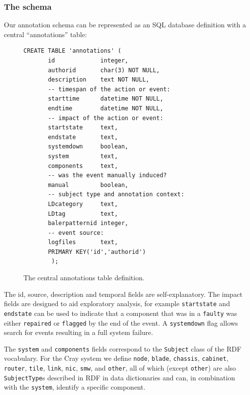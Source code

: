 \subsubsection{The schema}

Our annotation schema can be represented as an SQL database definition with a central 
``annotations'' table:

\begin{figure}[H]
\begin{small}
\begin{verbatim}
CREATE TABLE 'annotations' (
       id             integer,
       authorid       char(3) NOT NULL,
       description    text NOT NULL,
       -- timespan of the action or event:
       starttime      datetime NOT NULL,
       endtime        datetime NOT NULL,
       -- impact of the action or event:
       startstate     text,
       endstate       text,
       systemdown     boolean,
       system         text,
       components     text,
       -- was the event manually induced?
       manual         boolean,
       -- subject type and annotation context:
       LDcategory     text,
       LDtag          text,
       balerpatternid integer,
       -- event source:
       logfiles       text,
       PRIMARY KEY('id','authorid')
        );
\end{verbatim}
\end{small}
\caption{The central annotations table definition. }
\label{f:ann-table}
\end{figure}

The id, source, description and temporal fields are self-explanatory. 
The impact fields are designed to aid exploratory analysis, for example
\texttt{startstate} and \texttt{endstate} can be used to indicate that
a component that was in a \texttt{faulty} was either \texttt{repaired}
or \texttt{flagged} by the end of the event. A \texttt{systemdown} flag
allows search for events resulting in a full system failure.

The \texttt{system} and \texttt{components} fields correspond to the 
\texttt{Subject} class of the RDF vocabulary.
For the Cray system we define \texttt{node}, \texttt{blade}, \texttt{chassis},
\texttt{cabinet}, \texttt{router}, \texttt{tile}, \texttt{link}, \texttt{nic},
\texttt{smw}, and \texttt{other}, all of which (except \texttt{other}) are 
also \texttt{SubjectType}s described in RDF in data dictionaries and can, in
combination with the \texttt{system}, identify a specific component.

